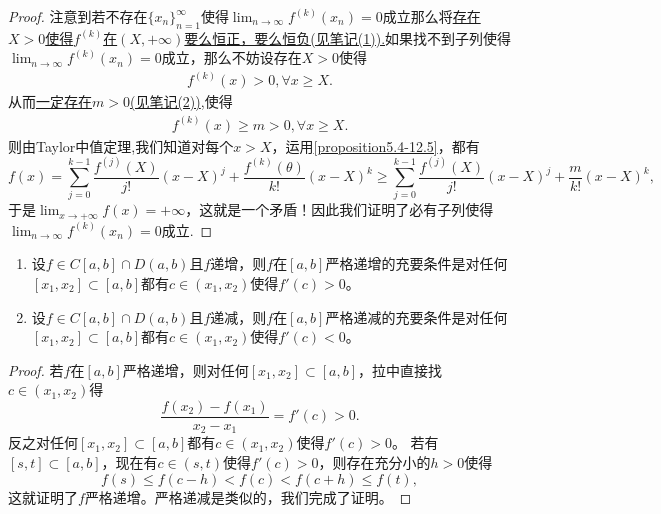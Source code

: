 \documentclass[lang=cn,newtx,10pt,scheme=chinese]{elegantbook}
\begin{document}
\begin{proof}
   注意到若不存在\(\{x_n\}_{n = 1}^{\infty}\)使得\(\lim_{n\rightarrow\infty}f^{(k)}(x_n)=0\)成立那么将\hyperlink{proposition5.4由假设得到这个结论的原因}{存在\(X > 0\)使得\(f^{(k)}\)在\((X,+\infty)\)要么恒正，要么恒负(见笔记(1)).}如果找不到子列使得\(\lim_{n\rightarrow\infty}f^{(k)}(x_n)=0\)成立，那么不妨设存在\(X> 0\)使得
   \begin{align*}
      f^{(k)}(x)>0,\forall x\geqslant X.
   \end{align*}
从而\hyperlink{m的存在性}{一定存在$m>0$(见笔记(2))},使得
\begin{align}\label{proposition5.4-12.5}
   f^{(k)}(x)\geqslant m>0,\forall x\geqslant X.
\end{align}
则由Taylor中值定理,我们知道对每个\(x > X\)，运用\eqref{proposition5.4-12.5}，都有
\[f(x)=\sum_{j = 0}^{k - 1}\frac{f^{(j)}(X)}{j!}(x - X)^j+\frac{f^{(k)}(\theta)}{k!}(x - X)^k\geqslant\sum_{j = 0}^{k - 1}\frac{f^{(j)}(X)}{j!}(x - X)^j+\frac{m}{k!}(x - X)^k,\]
于是\(\lim_{x\rightarrow +\infty}f(x)=+\infty\)，这就是一个矛盾！因此我们证明了必有子列使得\(\lim_{n\rightarrow\infty}f^{(k)}(x_n)=0\)成立.
\end{proof}

\begin{theorem}[严格单调和导数的关系]\label{theorem:严格单调和导数的关系}
\begin{enumerate}
\item 设\(f\in C[a,b]\cap D(a,b)\)且\(f\)递增，则\(f\)在\([a,b]\)严格递增的充要条件是对任何\([x_1,x_2]\subset [a,b]\)都有\(c\in(x_1,x_2)\)使得\(f'(c)>0\)。
   
\item 设\(f\in C[a,b]\cap D(a,b)\)且\(f\)递减，则\(f\)在\([a,b]\)严格递减的充要条件是对任何\([x_1,x_2]\subset [a,b]\)都有\(c\in(x_1,x_2)\)使得\(f'(c)<0\)。
\end{enumerate}
\end{theorem}
\begin{proof}
若\(f\)在\([a,b]\)严格递增，则对任何\([x_1,x_2]\subset [a,b]\)，拉中直接找\(c\in(x_1,x_2)\)得
   \[
   \frac{f(x_2)-f(x_1)}{x_2 - x_1}=f'(c)>0.
   \]
   反之对任何\([x_1,x_2]\subset [a,b]\)都有\(c\in(x_1,x_2)\)使得\(f'(c)>0\)。
   若有\([s,t]\subset [a,b]\)，现在有\(c\in(s,t)\)使得\(f'(c)>0\)，则存在充分小的\(h > 0\)使得
   \[
   f(s)\leqslant f(c - h)<f(c)<f(c + h)\leqslant f(t),
   \]
   这就证明了\(f\)严格递增。严格递减是类似的，我们完成了证明。
\end{proof}
\end{document}
